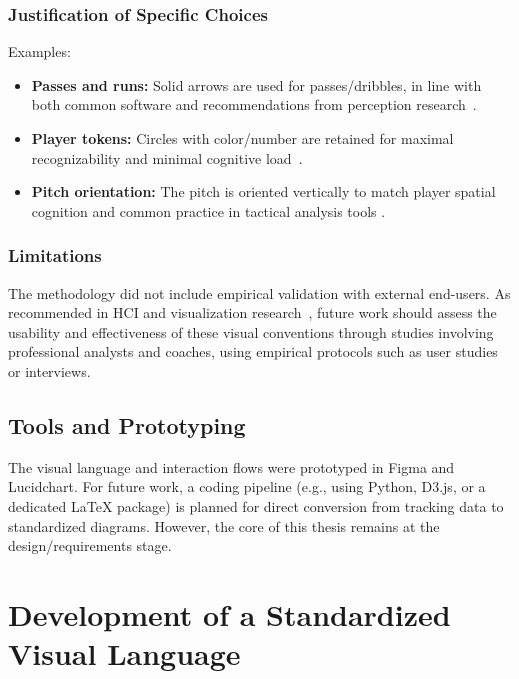 \documentclass[11pt,a4paper,openright]{report}
\begin{document}
\subsection{Justification of Specific Choices}

Examples:
\begin{itemize}
\item \textbf{Passes and runs:} Solid arrows are used for passes/dribbles, in line with both common software and recommendations from perception research~\cite{ware2013information, bertin2011semiology}.
\item \textbf{Player tokens:} Circles with color/number are retained for maximal recognizability and minimal cognitive load~\cite{perin2013soccerstories, metulini2016spatio}.
\item \textbf{Pitch orientation:} The pitch is oriented vertically to match player spatial cognition and common practice in tactical analysis tools \cite{perin2013soccerstories, munzner2014visualization}.

\end{itemize}

\subsection{Limitations}

The methodology did not include empirical validation with external end-users. As recommended in HCI and visualization research~\cite{maiden2023designing, munzner2014visualization}, future work should assess the usability and effectiveness of these visual conventions through studies involving professional analysts and coaches, using empirical protocols such as user studies or interviews.


\section{Tools and Prototyping}

The visual language and interaction flows were prototyped in Figma and Lucidchart. For future work, a coding pipeline (e.g., using Python, D3.js, or a dedicated LaTeX package) is planned for direct conversion from tracking data to standardized diagrams. However, the core of this thesis remains at the design/requirements stage.




\chapter{Development of a Standardized Visual Language}
\label{chap:visual_language}
\end{document}

